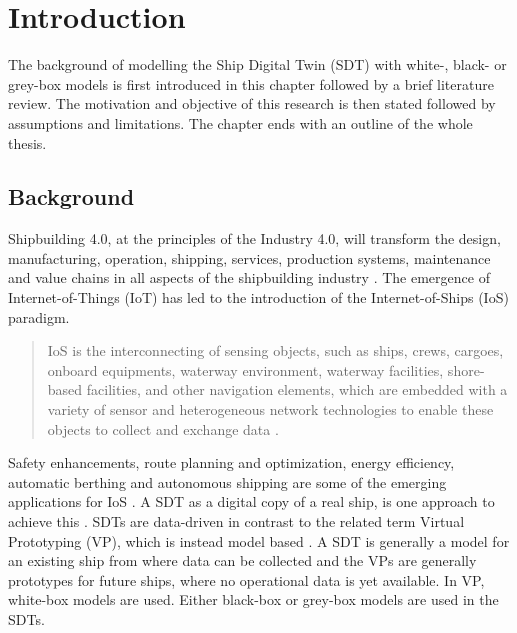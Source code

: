 \chapter{Introduction}
The background of modelling the Ship Digital Twin (SDT) with white-, black- or grey-box models is first introduced in this chapter followed by a brief literature review. The motivation and objective of this research is then stated followed by assumptions and limitations. The chapter ends with an outline of the whole thesis.

\section{Background}
Shipbuilding 4.0, at the principles of the Industry 4.0, will transform the design, manufacturing, operation, shipping, services, production systems, maintenance and value chains in all aspects of the shipbuilding 
industry \cite{stanic_toward_2018}.
The emergence of Internet-of-Things (IoT) has led to the introduction of the Internet-of-Ships (IoS) paradigm. \begin{quote} IoS is the interconnecting of sensing objects, such as ships, crews, cargoes, onboard equipments, waterway environment, waterway facilities, shore-based facilities, and other navigation elements, which are embedded with a variety of sensor and heterogeneous network technologies to enable these objects to collect and exchange data \cite{liu_internet_2016-1}.\end{quote}
Safety enhancements, route planning and optimization, energy efficiency, automatic berthing and autonomous shipping are some of the emerging applications for IoS \cite{aslam_internet_2020}.
A SDT as a digital copy of a real ship, is one approach to achieve this \cite{chen_review_2021}. 
SDTs are data-driven in contrast to the related term Virtual Prototyping (VP), which is instead model based \cite{major_framework_2021}. A SDT is generally a model for an existing ship from where data can be collected and the VPs are generally prototypes for future ships, where no operational data is yet available.
In VP, white-box models are used. Either black-box or grey-box models are used in the SDTs. 


